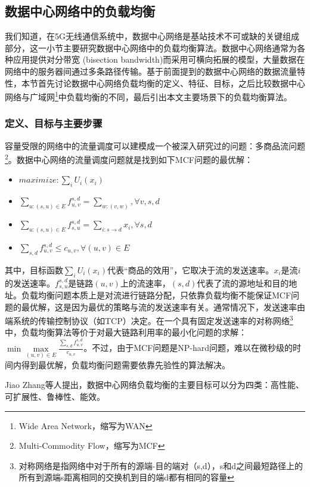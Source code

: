 \subsection{数据中心网络中的负载均衡}
我们知道，在5G无线通信系统中，数据中心网络是基站技术不可或缺的关键组成部分，这一小节主要研究数据中心网络中的负载均衡算法。数据中心网络通常为各种应用提供对分带宽 (bisection bandwidth)而采用可横向拓展的模型\cite{zhang2018survey}，大量数据在网络中的服务器间通过多条路径传输。基于前面提到的数据中心网络的数据流量特性，本节首先讨论数据中心网络负载均衡的定义、特征、目标，之后比较数据中心网络与广域网\footnote{Wide Area Network，缩写为WAN}中负载均衡的不同，最后引出本文主要场景下的负载均衡算法。
\subsubsection{定义、目标与主要步骤}
容量受限的网络中的流量调度可以建模成一个被深入研究过的问题：多商品流问题\footnote{Multi-Commodity Flow，缩写为MCF}。数据中心网络的流量调度问题就是找到如下MCF问题的最优解：
\begin{itemize}
    \item $ maximize: \sum\limits_{i}U_i(x_i)$
    \item $\sum\limits_{u:(s,u) \in E}f_{u,v}^{s,d} = \sum\limits_{w:(v,w)}, \forall v,s,d$
    \item $\sum\limits_{u:(s,u) \in E}f_{s,u}^{s,d} = \sum\limits_{i:s \rightarrow d}x_i, \forall s,d $
    \item $\sum\limits_{s,d}f_{u,v}^{s,d} \leq c_{u,v}, \forall (u,v) \in E $
\end{itemize}

其中，目标函数$\sum\limits_{i}U_i(x_i)$代表“商品的效用”，它取决于流的发送速率。$x_i$是流$i$的发送速率。$f_{s,u}^{s,d}$是链路$(u,v)$上的流速率，$(s,d)$代表了流的源地址和目的地址。负载均衡问题本质上是对流进行链路分配，只依靠负载均衡不能保证MCF问题的最优解，这是因为最优的策略与流的发送速率有关。通常情况下，发送速率由端系统的传输控制协议（如TCP）决定。在一个具有固定发送速率的对称网络\footnote{对称网络是指网络中对于所有的源端-目的端对（s,d），s和d之间最短路径上的所有到源端s距离相同的交换机到目的端d都有相同的容量}中，负载均衡算法等价于对最大链路利用率的最小化问题的求解：$\min \max\limits_{(u,v) \in E} \frac{\sum\limits_{s,d}f_{u,v}^{s,d}}{c_{u,v}} $。不过，由于MCF问题是NP-hard问题，难以在微秒级的时间内得到最优解，负载均衡问题需要依靠先验性的算法解决。

Jiao Zhang等人\cite{zhang2018survey}提出，数据中心网络负载均衡的主要目标可以分为四类：高性能、可扩展性、鲁棒性、能效。

